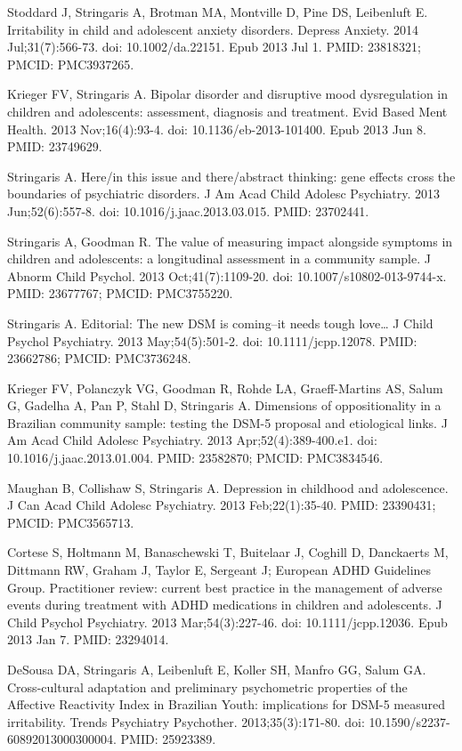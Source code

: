 \documentclass[
]{article}
\begin{document}
Stoddard J, Stringaris A, Brotman MA, Montville D, Pine DS, Leibenluft
E. Irritability in child and adolescent anxiety disorders. Depress
Anxiety. 2014 Jul;31(7):566-73. doi: 10.1002/da.22151. Epub 2013 Jul 1.
PMID: 23818321; PMCID: PMC3937265.

Krieger FV, Stringaris A. Bipolar disorder and disruptive mood
dysregulation in children and adolescents: assessment, diagnosis and
treatment. Evid Based Ment Health. 2013 Nov;16(4):93-4. doi:
10.1136/eb-2013-101400. Epub 2013 Jun 8. PMID: 23749629.

Stringaris A. Here/in this issue and there/abstract thinking: gene
effects cross the boundaries of psychiatric disorders. J Am Acad Child
Adolesc Psychiatry. 2013 Jun;52(6):557-8. doi:
10.1016/j.jaac.2013.03.015. PMID: 23702441.

Stringaris A, Goodman R. The value of measuring impact alongside
symptoms in children and adolescents: a longitudinal assessment in a
community sample. J Abnorm Child Psychol. 2013 Oct;41(7):1109-20. doi:
10.1007/s10802-013-9744-x. PMID: 23677767; PMCID: PMC3755220.

Stringaris A. Editorial: The new DSM is coming--it needs tough
love\ldots{} J Child Psychol Psychiatry. 2013 May;54(5):501-2. doi:
10.1111/jcpp.12078. PMID: 23662786; PMCID: PMC3736248.

Krieger FV, Polanczyk VG, Goodman R, Rohde LA, Graeff-Martins AS, Salum
G, Gadelha A, Pan P, Stahl D, Stringaris A. Dimensions of
oppositionality in a Brazilian community sample: testing the DSM-5
proposal and etiological links. J Am Acad Child Adolesc Psychiatry. 2013
Apr;52(4):389-400.e1. doi: 10.1016/j.jaac.2013.01.004. PMID: 23582870;
PMCID: PMC3834546.

Maughan B, Collishaw S, Stringaris A. Depression in childhood and
adolescence. J Can Acad Child Adolesc Psychiatry. 2013 Feb;22(1):35-40.
PMID: 23390431; PMCID: PMC3565713.

Cortese S, Holtmann M, Banaschewski T, Buitelaar J, Coghill D,
Danckaerts M, Dittmann RW, Graham J, Taylor E, Sergeant J; European ADHD
Guidelines Group. Practitioner review: current best practice in the
management of adverse events during treatment with ADHD medications in
children and adolescents. J Child Psychol Psychiatry. 2013
Mar;54(3):227-46. doi: 10.1111/jcpp.12036. Epub 2013 Jan 7. PMID:
23294014.

DeSousa DA, Stringaris A, Leibenluft E, Koller SH, Manfro GG, Salum GA.
Cross-cultural adaptation and preliminary psychometric properties of the
Affective Reactivity Index in Brazilian Youth: implications for DSM-5
measured irritability. Trends Psychiatry Psychother. 2013;35(3):171-80.
doi: 10.1590/s2237-60892013000300004. PMID: 25923389.
\end{document}
